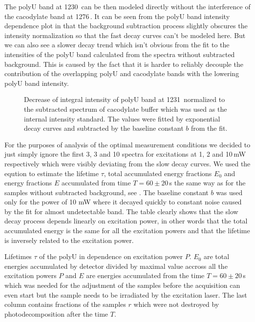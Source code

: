 The polyU band at 1230\,\icm{} can be then modeled directly without the
interference of the cacodylate band at 1276\,\icm{}. It can be seen from the
polyU band intensity dependence plot in
that the background subtraction process slightly obscures the intensity
normalization so that the fast decay curves can't be modeled here. But we can
also see a slower decay trend which isn't obvious from the fit to the
intensities of the polyU band calculated from the spectra without subtracted
background. This is caused by the fact that it is harder to reliably decouple
the contribution of the overlapping polyU and cacodylate bands with the
lowering polyU band intensity.

\begin{figure}
	\centering
	
	\caption{Decrease of integral intensity of polyU band at 1231\,\icm{}
		normalized to the subtracted spectrum of cacodylate buffer which was used
		as the internal intensity standard. The values were fitted by exponential
		decay curves  and subtracted by the baseline
		constant $b$ from the fit.}
	\label{\figlabel{power_optim:triplexes2}}
\end{figure}

For the purposes of analysis of the optimal measurement conditions we decided
to just simply ignore the first 3, 3 and 10 spectra for excitations at 1, 2 and
10\,mW respectively which were visibly deviating from the slow decay curves. We
used the eqution
to estimate the lifetime $\tau$, total accumulated energy fractions $E_0$ and
energy fractions $E$ accumulated from time $T = 60\pm20$\,s the same way as
for the samples without subtracted background, see
. The baseline constant $b$ was used
only for the power of 10 mW where it decayed quickly to constant noise caused
by the fit for almost undetectable band. The table clearly shows that the slow
decay process depends linearly on excitation power, in other words that the
total accumulated energy is the same for all the excitation powers and that
the lifetime is inversely related to the excitation power.

\begin{table}
	\centering
	
	\caption{Lifetimes $\tau$ of the polyU in dependence on excitation power
		$P$. $E_0$ are total energies accumulated by detector divided by maximal
		value accross all the excitation powers $P$ and $E$ are energies
		accumulated from the time $T = 60\pm20$\,s which was needed for the
		adjustment of the samples before the acquisition can even start but
		the sample needs to be irradiated by the excitation laser. The last column
		contains fractions of the samples $r$ which were not destroyed by
		photodecomposition after the time $T$.
	}
	\label{\tablabel{power_optim:lifetimes_triplexes2}}
\end{table}

